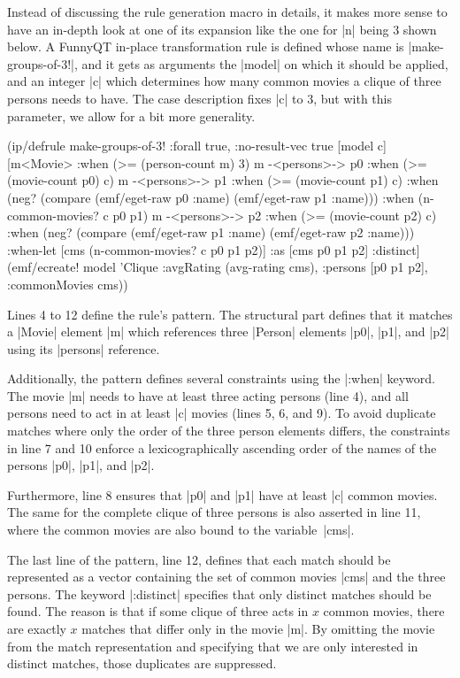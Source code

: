 \documentclass[submission]{eptcs}
\newcommand{\code}{\clojureinline}
\begin{document}
Instead of discussing the rule generation macro in details, it makes more sense
to have an in-depth look at one of its expansion like the one for \code|n|
being 3 shown below.  A FunnyQT in-place transformation rule is defined whose
name is \code|make-groups-of-3!|, and it gets as arguments the \code|model| on
which it should be applied, and an integer \code|c| which determines how many
common movies a clique of three persons needs to have.  The case description
fixes \code|c| to 3, but with this parameter, we allow for a bit more
generality.

\begin{clojurecode}
(ip/defrule make-groups-of-3!
  {:forall true, :no-result-vec true}
  [model c]
  [m<Movie>           :when (>= (person-count m) 3)
   m -<persons>-> p0  :when (>= (movie-count p0) c)
   m -<persons>-> p1  :when (>= (movie-count p1) c)
                      :when (neg? (compare (emf/eget-raw p0 :name) (emf/eget-raw p1 :name)))
                      :when (n-common-movies? c p0 p1)
   m -<persons>-> p2  :when (>= (movie-count p2) c)
                      :when (neg? (compare (emf/eget-raw p1 :name) (emf/eget-raw p2 :name)))
   :when-let [cms (n-common-movies? c p0 p1 p2)]
   :as [cms p0 p1 p2] :distinct]
  (emf/ecreate! model 'Clique {:avgRating (avg-rating cms), :persons [p0 p1 p2], :commonMovies cms}))
\end{clojurecode}

Lines 4 to 12 define the rule's pattern.  The structural part defines that it
matches a \code|Movie| element \code|m| which references three \code|Person|
elements \code|p0|, \code|p1|, and \code|p2| using its \code|persons|
reference.

Additionally, the pattern defines several constraints using the \code|:when|
keyword.  The movie \code|m| needs to have at least three acting persons (line
4), and all persons need to act in at least \code|c| movies (lines 5, 6, and
9).  To avoid duplicate matches where only the order of the three person
elements differs, the constraints in line 7 and 10 enforce a lexicographically
ascending order of the names of the persons \code|p0|, \code|p1|, and
\code|p2|.

Furthermore, line 8 ensures that \code|p0| and \code|p1| have at least \code|c|
common movies.  The same for the complete clique of three persons is also
asserted in line 11, where the common movies are also bound to the
variable~\code|cms|.

The last line of the pattern, line 12, defines that each match should be
represented as a vector containing the set of common movies \code|cms| and the
three persons.  The keyword \code|:distinct| specifies that only distinct
matches should be found.  The reason is that if some clique of three acts in
\(x\)
common movies, there are exactly \(x\)
matches that differ only in the movie \code|m|.  By omitting the movie from the
match representation and specifying that we are only interested in distinct
matches, those duplicates are suppressed.
\end{document}
